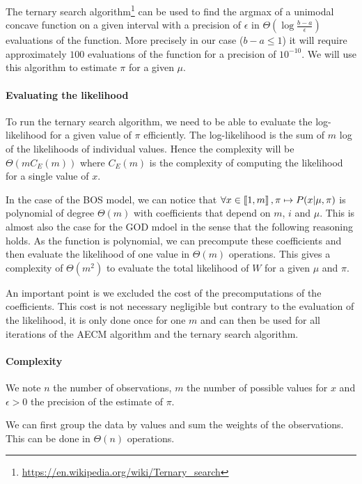 The ternary search algorithm\footnote{\url{https://en.wikipedia.org/wiki/Ternary_search}} can be used to find the argmax of a unimodal concave function on a given interval with a precision of $\epsilon$ in $\Theta(\log \frac{b - a}{\epsilon})$ evaluations of the function. More precisely in our case ($b - a \leq 1$) it will require approximately $100$ evaluations of the function for a precision of $10^{-10}$.
We will use this algorithm to estimate $\pi$ for a given $\mu$.



\paragraph{Evaluating the likelihood}

To run the ternary search algorithm, we need to be able to evaluate the log-likelihood for a given value of $\pi$ efficiently.
The log-likelihood is the sum of $m$ log of the likelihoods of individual values.
Hence the complexity will be $\Theta(m C_E(m))$ where $C_E(m)$ is the complexity of computing the likelihood for a single value of $x$.

In the case of the BOS model, we can notice that $\forall x \in \left\llbracket1, m\right\rrbracket, \pi \mapsto P(x | \mu, \pi)$ is polynomial of degree $\Theta(m)$ with coefficients that depend on $m$, $i$ and $\mu$. This is almost also the case for the GOD mdoel in the sense that the following reasoning holds. As the function is polynomial, we can precompute these coefficients and then evaluate the likelihood of one value in $\Theta(m)$ operations. This gives a complexity of $\Theta(m^2)$ to evaluate the total likelihood of $W$ for a given $\mu$ and $\pi$. 

An important point is we excluded the cost of the precomputations of the coefficients. This cost is not necessary negligible but contrary to the evaluation of the likelihood, it is only done once for one $m$ and can then be used for all iterations of the AECM algorithm and the ternary search algorithm.


\paragraph{Complexity}

We note $n$ the number of observations, $m$ the number of possible values for $x$ and $\epsilon > 0$ the precision of the estimate of $\pi$.

We can first group the data by values and sum the weights of the observations. This can be done in $\Theta(n)$ operations.

